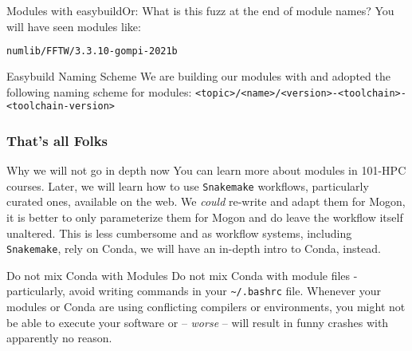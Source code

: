 \begin{frame}[fragile]
   {Modules with easybuild\newline Or: What is this fuzz at the end of module names?}
   You will have seen modules like:
   \begin{lstlisting}[language=Bash, style=Shell]
numlib/FFTW/3.3.10-gompi-2021b   
   \end{lstlisting}
   \pause
   \begin{block}{Easybuild Naming Scheme}
    We are building our modules with  and adopted the following naming scheme for modules:\newline
    \footnotesize \verb+<topic>/<name>/<version>-<toolchain>-<toolchain-version>+
   \end{block}
   \pause
\end{frame}

\begin{frame}[fragile]
  \frametitle{That's all Folks}
   \vspace{-0.8em}
  \begin{alertblock}{Why we will not go in depth now}
You can learn more about modules in 101-HPC courses. Later, we will learn how to use \texttt{Snakemake} workflows, particularly curated ones, available on the web. We \emph{could} re-write and adapt them for Mogon, it is better to only parameterize them for Mogon and do leave the workflow itself unaltered. This is less cumbersome and as workflow systems, including \texttt{Snakemake}, rely on Conda, we will have an in-depth intro to Conda, instead.
  \end{alertblock}
  \vfill
  \begin{alertblock}{Do not mix Conda with Modules}
   Do not mix Conda with module files - particularly, avoid writing  commands in your \texttt{\textasciitilde/.bashrc} file.\newline
   Whenever your modules or Conda are using conflicting compilers or environments, you might not be able to execute your software or -- \emph{worse} -- will result in funny crashes with apparently no reason.
  \end{alertblock}
\end{frame}

